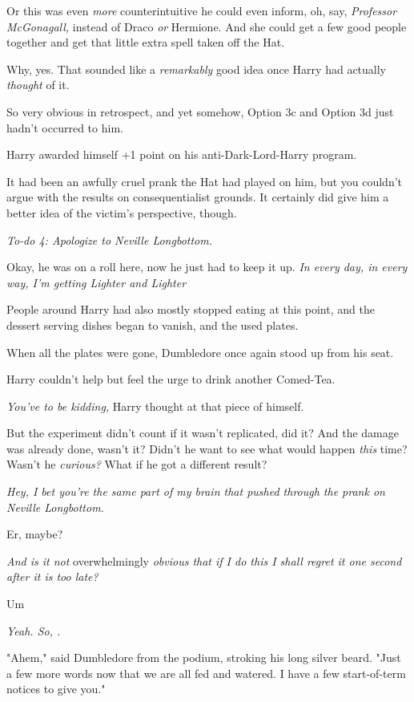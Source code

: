 Or{\el} this was even \emph{more} counterintuitive{\el} he could even
inform, oh, say, \emph{Professor McGonagall,} instead of Draco \emph{or}
Hermione. And she could get a few good people together and get that little
extra spell taken off the Hat.

Why, yes. That sounded like a \emph{remarkably} good idea once Harry had
actually \emph{thought} of it.

So very obvious in retrospect, and yet somehow, Option 3c and Option 3d just
hadn't occurred to him.

Harry awarded himself +1 point on his anti-Dark-Lord-Harry program.

It had been an awfully cruel prank the Hat had played on him, but you couldn't
argue with the results on consequentialist grounds. It certainly did give him a
better idea of the victim's perspective, though.

\emph{To-do 4: Apologize to Neville Longbottom.}

Okay, he was on a roll here, now he just had to keep it up. \emph{In every day,
in every way, I'm getting Lighter and Lighter{\el}}

People around Harry had also mostly stopped eating at this point, and the
dessert serving dishes began to vanish, and the used plates.

When all the plates were gone, Dumbledore once again stood up from his seat.

Harry couldn't help but feel the urge to drink another Comed-Tea.

\emph{You've  to be kidding,} Harry thought at that piece of himself.

But the experiment didn't count if it wasn't replicated, did it? And the damage
was already done, wasn't it? Didn't he want to see what would happen
\emph{this} time? Wasn't he \emph{curious?} What if he got a different result?

\emph{Hey, I bet you're the same part of my brain that pushed through the prank
on Neville Longbottom.}

Er, maybe?

\emph{And is it not} overwhelmingly \emph{obvious that if I do this I shall
regret it one second after it is too late?}

Um{\el}

\emph{Yeah. So, .}

"Ahem," said Dumbledore from the podium, stroking his long silver beard. "Just
a few more words now that we are all fed and watered. I have a few
start-of-term notices to give you."

